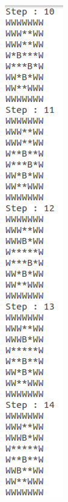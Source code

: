\documentclass[10pt, letter]{article}
\begin{document}
\begin{figure} [h!]
\begin{subfigure}{.3\textwidth}
  \includegraphics[scale = 0.35]{images/sokobanC-ans3}
\end{subfigure}\\
\begin{subfigure}{.5\textwidth}
  \centering

\end{subfigure}
\end{figure}
\end{document}
